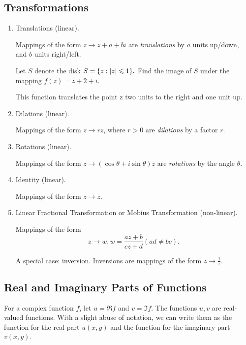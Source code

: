 \documentclass[11pt,reqno,oneside,a4paper]{article}
\begin{document}
\subsection{Transformations}
\begin{enumerate}
	\item Translations (linear). 
	
	Mappings of the form $z\to z+a+bi$ are \textit{translations} by $a$ units up/down, and $b$ units right/left.
	
	\begin{eg}
		Let $S$ denote the disk $S = \{z:\left\lvert z\right\rvert \leqslant 1\}.$ Find the image of $S$ under the mapping $f(z) = z+2+i$. 
		
		This function translates
		the point z two units to the right and one unit up.
	\end{eg} 
	
	\item Dilations (linear). 
	
	Mappings of the form $z\to rz$, where $r>0$ are \textit{dilations} by a factor $r$. 
	
	\item Rotations (linear).
	
	Mappings of the form $z \to (\cos\theta + i \sin \theta) z$ are \textit{rotations} by the angle $\theta$.
	
	\item Identity (linear). 
	
	Mappings of the form $z\to z$. 
	
	\item Linear Fractional Transformation or Mobius Transformation (non-linear).
	
	Mappings of the form $$z\to w, w = \frac{az+b}{cz+d} (ad\neq bc).$$
	
	\begin{eg}
		A special case: inversion. Inversions are mappings of the form $z \to \frac{1}{z}.$
	\end{eg}
\end{enumerate}

\subsection{Real and Imaginary Parts of Functions}

\par For a complex function $f$, let $u = \Re f$ and $v = \Im f.$ The functions $u,v$ are real-valued functions. With a slight abuse of notation, we can write them as the function for the real part $u(x,y)$ and the function for the imaginary part $v(x,y).$
\end{document}
